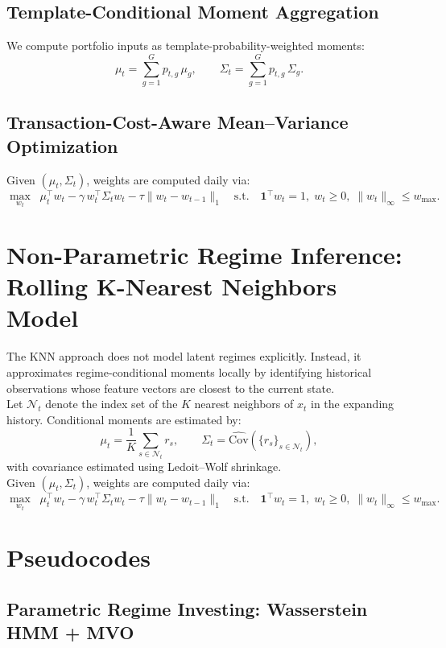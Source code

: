 \documentclass[11pt]{article}
\begin{document}
\subsection{Template-Conditional Moment Aggregation}

We compute portfolio inputs as template-probability-weighted moments:
\[
\mu_t = \sum_{g=1}^{G} p_{t,g}\,\mu_g,\qquad
\Sigma_t = \sum_{g=1}^{G} p_{t,g}\,\Sigma_g.
\]

\subsection{Transaction-Cost-Aware Mean--Variance Optimization}

Given $(\mu_t,\Sigma_t)$, weights are computed daily via:
\[
\max_{w_t} \;\; \mu_t^\top w_t - \gamma\, w_t^\top \Sigma_t w_t - \tau \|w_t-w_{t-1}\|_1
\quad \text{s.t.}\quad \mathbf{1}^\top w_t=1,\; w_t\ge 0,\; \|w_t\|_\infty \le w_{\max}.
\]

\section{Non-Parametric Regime Inference: Rolling K-Nearest Neighbors Model}
\label{sec:knn}

The KNN approach does not model latent regimes explicitly.
Instead, it approximates regime-conditional moments locally by identifying historical observations whose feature vectors are closest to the current state.\\
Let $\mathcal{N}_t$ denote the index set of the $K$ nearest neighbors of $x_t$ in the expanding history.
Conditional moments are estimated by:
\[
\mu_t = \frac{1}{K} \sum_{s \in \mathcal{N}_t} r_s,
\qquad
\Sigma_t = \widehat{\mathrm{Cov}}\left(\{r_s\}_{s \in \mathcal{N}_t}\right),
\]
with covariance estimated using Ledoit--Wolf shrinkage.\\
Given $(\mu_t,\Sigma_t)$, weights are computed daily via:
\[
\max_{w_t} \;\; \mu_t^\top w_t - \gamma\, w_t^\top \Sigma_t w_t - \tau \|w_t-w_{t-1}\|_1
\quad \text{s.t.}\quad \mathbf{1}^\top w_t=1,\; w_t\ge 0,\; \|w_t\|_\infty \le w_{\max}.
\]
\section{Pseudocodes}

\subsection{Parametric Regime Investing: Wasserstein HMM + MVO}
\label{subsec:parametric_pseudocode}
\end{document}
